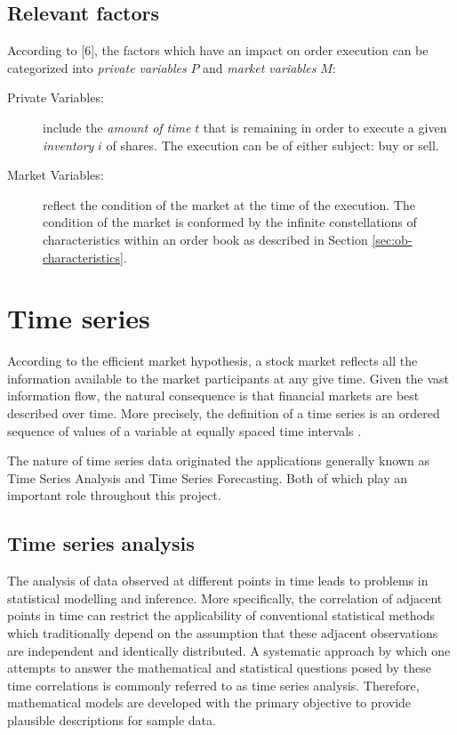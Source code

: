 \subsection{Relevant factors}

According to [6], the factors which have an impact on order execution can be categorized into \textit{private variables} $P$ and \textit{market variables} $M$:
\begin{description}
    \item[Private Variables:] include the \textit{amount of time} $t$ that is remaining in order to execute a given \textit{inventory} $i$ of shares.
    The execution can be of either subject: buy or sell.
    \item[Market Variables:] reflect the condition of the market at the time of the execution.
    The condition of the market is conformed by the infinite constellations of characteristics  within an order book as described in Section \ref{sec:ob-characteristics}.
    
\end{description}


\section{Time series}

According to the efficient market hypothesis\cite{malkiel1989efficient}, a stock market reflects all the information available to the market participants at any give time. 
Given the vast information flow, the natural consequence is that financial markets are best described over time. 
More precisely, the definition of a time series is an ordered sequence of values of a variable at equally spaced time intervals \cite{intro-timeseries}.

The nature of time series data originated the applications generally known as Time Series Analysis and Time Series Forecasting. 
Both of which play an important role throughout this project.

\subsection{Time series analysis}

The analysis of data observed at different points in time leads to problems in statistical modelling and inference. 
More specifically, the correlation of adjacent points in time can restrict the applicability of conventional statistical methods which traditionally depend on the assumption that these adjacent observations are independent and identically distributed. 
A systematic approach by which one attempts to answer the mathematical and statistical questions posed by these time correlations is commonly referred to as time series analysis. 
Therefore, mathematical models are developed with the primary objective to provide plausible descriptions for sample data. \cite{shumway2000time}

